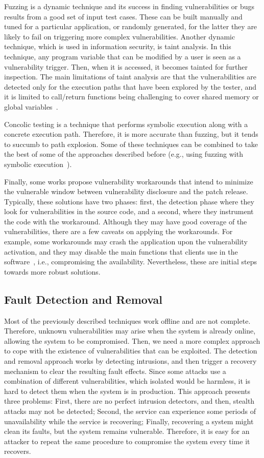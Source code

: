Fuzzing is a dynamic technique and its success in finding vulnerabilities or bugs results from a good set of input test cases.
These can be built manually and tuned for a particular application, or randomly generated, for the latter they are likely to fail on triggering more complex vulnerabilities.
Another dynamic technique, which is used in information security, is taint analysis.
In this technique, any program variable that can be modified by a user is seen as a vulnerability trigger. 
Then, when it is accessed, it becomes tainted for further inspection.
The main limitations of taint analysis are that the vulnerabilities are detected only for the execution paths that have been explored by the tester, and it is limited to call/return functions being challenging to cover shared memory or global variables~\cite{Yamaguchi:2015}.

Concolic testing is a technique that performs symbolic execution along with a concrete execution path. 
Therefore, it is more accurate than fuzzing, but it tends to succumb to path explosion.
Some of these techniques can be combined to take the best of some of the approaches described before (e.g., using fuzzing with symbolic execution~\cite{Stephens:2016}).

Finally, some works propose vulnerability workarounds that intend to minimize the vulnerable window between vulnerability disclosure and the patch release.
Typically, these solutions have two phases: first, the detection phase where they look for vulnerabilities in the source code, and a second, where they instrument the code with the workaround.
Although they may have good coverage of the vulnerabilities, there are a few caveats on applying the workarounds.
For example, some workarounds may crash the application upon the vulnerability activation, and they may disable the main functions that clients use in the software~\cite{Huang:2016}, i.e., compromising the availability. 
Nevertheless, these are initial steps towards more robust solutions.

\subsection{Fault Detection and Removal}
Most of the previously described techniques work offline and are not complete. 
Therefore, unknown vulnerabilities may arise when the system is already online, allowing the system to be compromised.
Then, we need a more complex approach to cope with the existence of vulnerabilities that can be exploited.
The detection and removal approach works by detecting intrusions, and then trigger a recovery mechanism to clear the resulting fault effects. 
Since some attacks use a combination of different vulnerabilities, which isolated would be harmless, it is hard to detect them when the system is in production. 
This approach presents three problems: 
First, there are no perfect intrusion detectors, and then, stealth attacks may not be detected; 
Second, the service can experience some periods of unavailability while the service is recovering; 
Finally, recovering a system might clean its faults, but the system remains vulnerable.
Therefore, it is easy for an attacker to repeat the same procedure to compromise the system every time it recovers.


